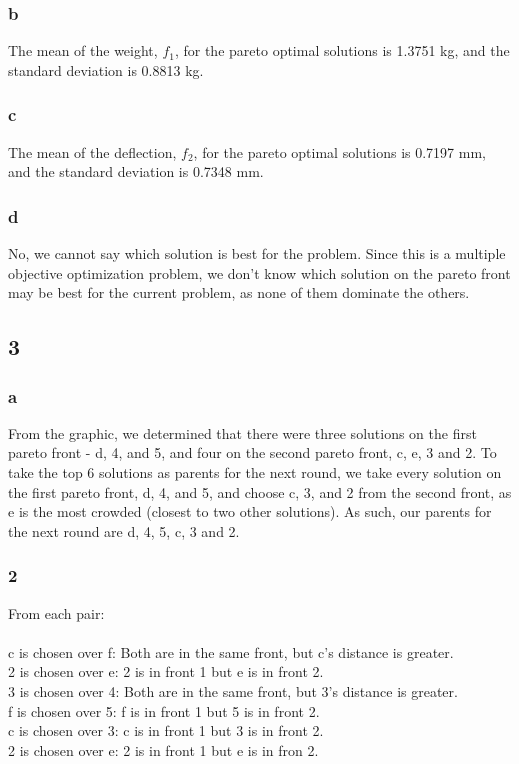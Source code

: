 \documentclass[12pt]{article}
\begin{document}
\subsubsection{b}
The mean of the weight, $f_1$, for the pareto optimal solutions is 1.3751 kg, and the standard deviation is 0.8813 kg.

\subsubsection{c}
The mean of the deflection, $f_2$, for the pareto optimal solutions is 0.7197 mm, and the standard deviation is 0.7348 mm.

\subsubsection{d}
No, we cannot say which solution is best for the problem. Since this is a multiple objective optimization problem, we don't know which solution on the pareto front may be best for the current problem, as none of them dominate the others.

\subsection{3}
\subsubsection{a}
From the graphic, we determined that there were three solutions on the first pareto front - d, 4, and 5, and four on the second pareto front, c, e, 3 and 2. To take the top 6 solutions as parents for the next round, we take every solution on the first pareto front, d, 4, and 5, and choose c, 3, and 2 from the second front, as e is the most crowded (closest to two other solutions). As such, our parents for the next round are d, 4, 5, c, 3 and 2.

\subsubsection{2}
From each pair:\\\\
c is chosen over f: Both are in the same front, but c's distance is greater.\\
2 is chosen over e: 2 is in front 1 but e is in front 2.\\
3 is chosen over 4: Both are in the same front, but 3's distance is greater.\\
f is chosen over 5: f is in front 1 but 5 is in front 2.\\
c is chosen over 3: c is in front 1 but 3 is in front 2.\\
2 is chosen over e: 2 is in front 1 but e is in fron 2. \\
\end{document}
